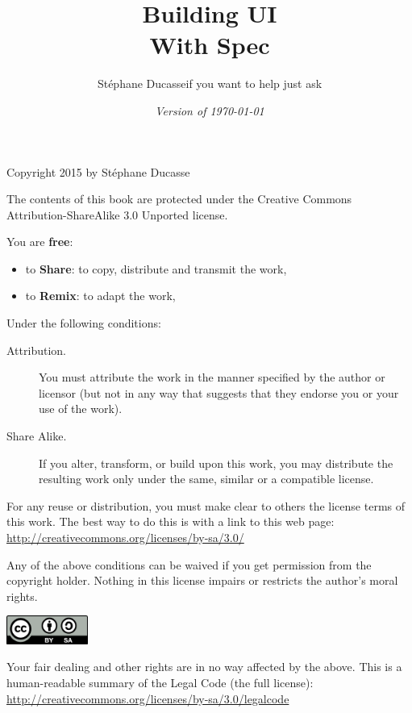 \documentclass[a4paper,10pt,twoside]{book}
\begin{document}
\frontmatter
\setcounter{page}{1}
\pagestyle{headings}
\author{
	St\'ephane Ducasse\quad if you want to help just ask
	}
\title{\Huge\bf Building UI  \\ With Spec}
\isodate
\date{\emph{Version of \today}}

\date{}
\maketitle


{\small

  Copyright 2015 by St\'ephane Ducasse

  The contents of this book are protected under the Creative Commons
  Attribution-ShareAlike 3.0 Unported license.

  You are \textbf{free}:
  \begin{itemize}
  \item to \textbf{Share}: to copy, distribute and transmit the work,
  \item to \textbf{Remix}: to adapt the work,
  \end{itemize}

  Under the following conditions:
  \begin{description}
  \item[Attribution.] You must attribute the work in the manner specified by the
    author or licensor (but not in any way that suggests that they endorse you
    or your use of the work).
  \item[Share Alike.] If you alter, transform, or build upon this work, you may
    distribute the resulting work only under the same, similar or a compatible
    license.
  \end{description}

  For any reuse or distribution, you must make clear to others the
  license terms of this work. The best way to do this is with a link to
  this web page: \\
  \url{http://creativecommons.org/licenses/by-sa/3.0/}

  Any of the above conditions can be waived if you get permission from
  the copyright holder. Nothing in this license impairs or restricts the
  author's moral rights.

  \begin{center}
    \includegraphics[width=0.2\textwidth]{support/latex/CreativeCommons-BY-SA.pdf}
  \end{center}

  Your fair dealing and other rights are in no way affected by the
  above. This is a human-readable summary of the Legal Code (the full
  license): \\
  \url{http://creativecommons.org/licenses/by-sa/3.0/legalcode}

  \vfill

}


\frontmatter
\pagestyle{plain}


\tableofcontents
\sloppy %
\mainmatter


\end{document}
